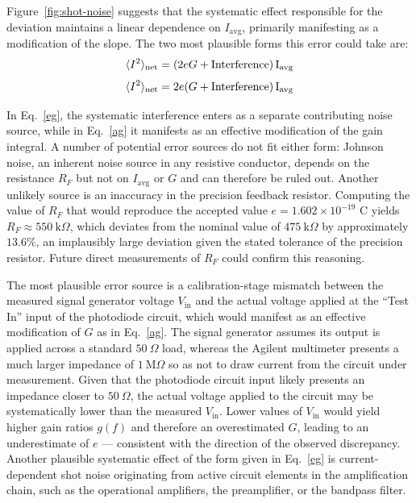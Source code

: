 \documentclass[aps,twocolumn,secnumarabic,balancelastpage,amsmath,amssymb,nofootinbib,floatfix]{revtex4-1}
\begin{document}
Figure~\ref{fig:shot-noise} suggests that the systematic effect responsible for the deviation maintains a linear dependence on $I_{\text{avg}}$, primarily manifesting as a modification of the slope. The two most plausible forms this error could take are:
\begin{equation}
\langle I^2\rangle_{\rm net}
=
(2eG + \rm Interference)  \,I_{\rm avg}
\label{eg}
\end{equation}
\begin{equation}
\langle I^2\rangle_{\rm net}
=
2e(G + \rm Interference)  \,I_{\rm avg} 
\label{ag}
\end{equation}

In Eq.~\eqref{eg}, the systematic interference enters as a separate contributing noise source, while in Eq.~\eqref{ag} it manifests as an effective modification of the gain integral. A number of potential error sources do not fit either form: Johnson noise, an inherent noise source in any resistive conductor, depends on the resistance $R_F$ but not on $I_{\text{avg}}$ or $G$ and can therefore be ruled out. Another unlikely source is an inaccuracy in the precision feedback resistor. Computing the value of $R_F$ that would reproduce the accepted value $e = 1.602 \times 10^{-19}$ C yields $R_F \approx 550\ \text{k}\Omega$, which deviates from the nominal value of $475\ \text{k}\Omega$ by approximately $13.6\%$, an implausibly large deviation given the stated tolerance of the precision resistor. Future direct measurements of $R_F$ could confirm this reasoning.

The most plausible error source is a calibration-stage mismatch between the measured signal generator voltage $V_\text{in}$ and the actual voltage applied at the ``Test In'' input of the photodiode circuit, which would manifest as an effective modification of $G$ as in Eq.~\eqref{ag}. The signal generator assumes its output is applied across a standard $50\ \Omega$ load, whereas the Agilent multimeter presents a much larger impedance of $1\ \text{M}\Omega$ so as not to draw current from the circuit under measurement. Given that the photodiode circuit input likely presents an impedance closer to $50\ \Omega$, the actual voltage applied to the circuit may be systematically lower than the measured $V_\text{in}$. Lower values of $V_{\text{in}}$ would yield higher gain ratios $g(f)$ and therefore an overestimated $G$, leading to an underestimate of $e$ — consistent with the direction of the observed discrepancy. Another plausible systematic effect of the form given in Eq.~\eqref{eg} is current-dependent shot noise originating from active circuit elements in the amplification chain, such as the operational amplifiers, the preamplifier, or the bandpass filter.
\end{document}
